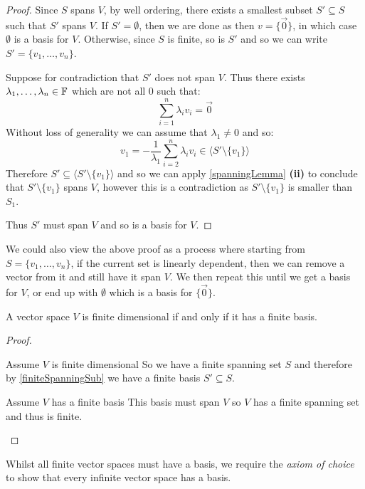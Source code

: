 \documentclass[../main.tex]{subfiles}
\begin{document}
\begin{proof}
  Since $S$ spans $V$, by well ordering, there exists a smallest subset $S' \subseteq S$ such that $S'$ spans $V$.
  If $S' = \emptyset$, then we are done as then $v = \{\vec{0}\}$, in which case $\emptyset$ is a basis for $V$.
  Otherwise, since $S$ is finite, so is $S'$ and so we can write $S' = \{v_1, \ldots, v_n\}$.

  Suppose for contradiction that $S'$ does not span $V$.
  Thus there exists $\lambda_1, \ldots, \lambda_n \in \mathbb{F}$ which are not all 0 such that:
  \[
    \sum_{i = 1}^{n} \lambda_i v_i = \vec{0}
  \]
  Without loss of generality we can assume that $\lambda_1 \neq 0$ and so:
  \[
    v_1 = - \frac{1}{\lambda_1} \sum_{i = 2}^{n} \lambda_i v_i \in \langle S' \setminus \{v_1\} \rangle
  \]
  Therefore $S' \subseteq \langle S' \setminus \{v_1\} \rangle$ and so we can apply \cref{spanningLemma} \textbf{(ii)} to conclude that $S' \setminus \{v_1\}$ spans $V$, however this is a contradiction as $S' \setminus \{v_1\}$ is smaller than $S_1$.

  Thus $S'$ must span $V$ and so is a basis for $V$.
\end{proof}
\begin{remark}
  We could also view the above proof as a process where starting from $S = \{v_1, \ldots, v_n\}$, if the current set is linearly dependent, then we can remove a vector from it and still have it span $V$.
  We then repeat this until we get a basis for $V$, or end up with $\emptyset$ which is a basis for $\{\vec{0}\}$.
\end{remark}
\begin{corollary}
  A vector space $V$ is finite dimensional if and only if it has a finite basis. \label{finiteVBasis}
\end{corollary}
\begin{proof}
  \begin{proofdirection}{Assume $V$ is finite dimensional}
    So we have a finite spanning set $S$ and therefore by \cref{finiteSpanningSub} we have a finite basis $S' \subseteq S$.
  \end{proofdirection}
  \begin{proofdirection}{Assume $V$ has a finite basis}
    This basis must span $V$ so $V$ has a finite spanning set and thus is finite.
  \end{proofdirection}
\end{proof}
\begin{remark}[Warning]
  Whilst all finite vector spaces must have a basis, we require the \textit{axiom of choice} to show that every infinite vector space has a basis.
\end{remark}
\end{document}
